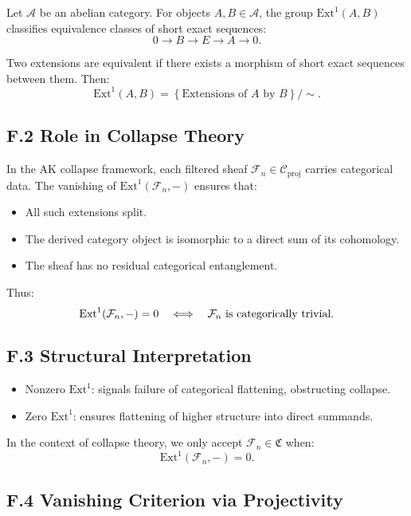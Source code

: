 \documentclass[11pt]{article}
\begin{document}
Let \( \mathcal{A} \) be an abelian category. For objects \( A, B \in \mathcal{A} \), the group \( \mathrm{Ext}^1(A, B) \) classifies equivalence classes of short exact sequences:
\[
0 \to B \to E \to A \to 0.
\]

\noindent Two extensions are equivalent if there exists a morphism of short exact sequences between them. Then:
\[
\mathrm{Ext}^1(A, B) = \left\{ \text{Extensions of } A \text{ by } B \right\} / \sim.
\]

\subsection*{F.2 Role in Collapse Theory}

In the AK collapse framework, each filtered sheaf \( \mathcal{F}_n \in \mathcal{C}_{\mathrm{proj}} \) carries categorical data. The vanishing of \( \mathrm{Ext}^1(\mathcal{F}_n, -) \) ensures that:
\begin{itemize}
  \item All such extensions split.
  \item The derived category object is isomorphic to a direct sum of its cohomology.
  \item The sheaf has no residual categorical entanglement.
\end{itemize}

Thus:
\[
\mathrm{Ext}^1(\mathcal{F}_n, -) = 0 \quad \Longleftrightarrow \quad \text{\( \mathcal{F}_n \) is categorically trivial}.
\]

\subsection*{F.3 Structural Interpretation}

\begin{itemize}
  \item Nonzero \( \mathrm{Ext}^1 \): signals failure of categorical flattening, obstructing collapse.
  \item Zero \( \mathrm{Ext}^1 \): ensures flattening of higher structure into direct summands.
\end{itemize}

In the context of collapse theory, we only accept \( \mathcal{F}_n \in \mathfrak{C} \) when:
\[
\mathrm{Ext}^1(\mathcal{F}_n, -) = 0.
\]

\subsection*{F.4 Vanishing Criterion via Projectivity}
\end{document}
